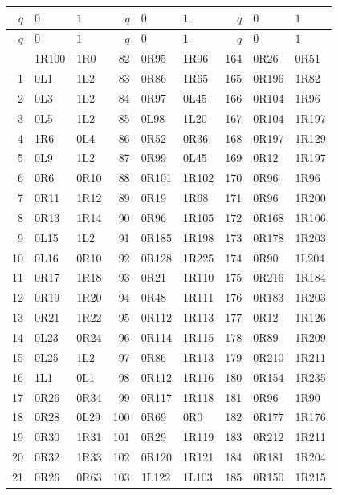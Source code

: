 \begingroup\small\ttfamily
\setlength{\tabcolsep}{5pt}
\begin{longtable}{@{}rll@{\hspace{8mm}}rll@{\hspace{8mm}}rll@{}}
\toprule
$q$ & $0$ & $1$ & $q$ & $0$ & $1$ & $q$ & $0$ & $1$\\
\midrule\endfirsthead
\toprule
$q$ & $0$ & $1$ & $q$ & $0$ & $1$ & $q$ & $0$ & $1$\\
\midrule\endhead
\bottomrule\endfoot
0 & 1R100 & 1R0 & 82 & 0R95 & 1R96 & 164 & 0R26 & 0R51\\
1 & 0L1 & 1L2 & 83 & 0R86 & 1R65 & 165 & 0R196 & 1R82\\
2 & 0L3 & 1L2 & 84 & 0R97 & 0L45 & 166 & 0R104 & 1R96\\
3 & 0L5 & 1L2 & 85 & 0L98 & 1L20 & 167 & 0R104 & 1R197\\
4 & 1R6 & 0L4 & 86 & 0R52 & 0R36 & 168 & 0R197 & 1R129\\
5 & 0L9 & 1L2 & 87 & 0R99 & 0L45 & 169 & 0R12 & 1R197\\
6 & 0R6 & 0R10 & 88 & 0R101 & 1R102 & 170 & 0R96 & 1R96\\
7 & 0R11 & 1R12 & 89 & 0R19 & 1R68 & 171 & 0R96 & 1R200\\
8 & 0R13 & 1R14 & 90 & 0R96 & 1R105 & 172 & 0R168 & 1R106\\
9 & 0L15 & 1L2 & 91 & 0R185 & 1R198 & 173 & 0R178 & 1R203\\
10 & 0L16 & 0R10 & 92 & 0R128 & 1R225 & 174 & 0R90 & 1L204\\
11 & 0R17 & 1R18 & 93 & 0R21 & 1R110 & 175 & 0R216 & 1R184\\
12 & 0R19 & 1R20 & 94 & 0R48 & 1R111 & 176 & 0R183 & 1R203\\
13 & 0R21 & 1R22 & 95 & 0R112 & 1R113 & 177 & 0R12 & 1R126\\
14 & 0L23 & 0R24 & 96 & 0R114 & 1R115 & 178 & 0R89 & 1R209\\
15 & 0L25 & 1L2 & 97 & 0R86 & 1R113 & 179 & 0R210 & 1R211\\
16 & 1L1 & 0L1 & 98 & 0R112 & 1R116 & 180 & 0R154 & 1R235\\
17 & 0R26 & 0R34 & 99 & 0R117 & 1R118 & 181 & 0R96 & 1R90\\
18 & 0R28 & 0L29 & 100 & 0R69 & 0R0 & 182 & 0R177 & 1R176\\
19 & 0R30 & 1R31 & 101 & 0R29 & 1R119 & 183 & 0R212 & 1R211\\
20 & 0R32 & 1R33 & 102 & 0R120 & 1R121 & 184 & 0R181 & 1R204\\
21 & 0R26 & 0R63 & 103 & 1L122 & 1L103 & 185 & 0R150 & 1R215\\

\end{longtable}
